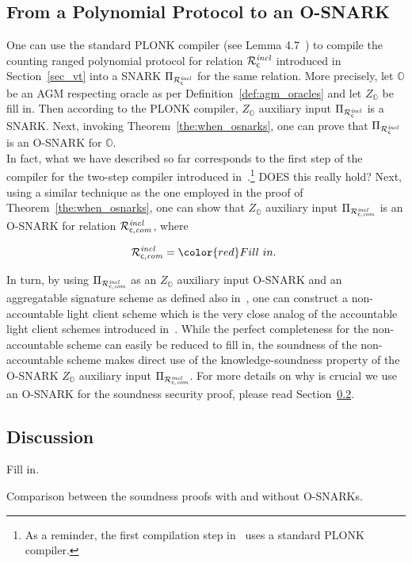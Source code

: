 \subsection{From a Polynomial Protocol to an O-SNARK}
\label{sec:interesting}
\noindent One can use the standard PLONK compiler (see Lemma 4.7~\cite{plonk}) to compile the 
counting ranged polynomial protocol for relation $\mathcal{R}^{\mathit{incl}}_{\mathsf{c}}$ introduced in Section~\ref{sec_vt} 
into a SNARK $\Pi_{\mathcal{R}^{\mathit{incl}}_{\mathsf{c}}}$ for the same relation. More precisely, let $\mathbb{O}$ be an 
AGM respecting oracle as per Definition~\ref{def:agm_oracles} and let $Z_{\mathbb{O}}$ be {\color{red} fill in}. 
Then according to the PLONK compiler, $Z_{\mathbb{O}}$ auxiliary input $\Pi_{\mathcal{R}^{\mathit{incl}}_{\mathsf{c}}}$ is a SNARK.
Next, invoking Theorem~\ref{the:when_osnarks}, one can prove that $\Pi_{\mathcal{R}^{\mathit{incl}}_{\mathsf{c}}}$ is an O-SNARK for $\mathbb{O}$. \\

\noindent In fact, what we have described so far corresponds to the first step of the compiler for the two-step compiler 
introduced in~\cite{LC_paper}.\footnote{As a reminder, the first compilation step in~\cite{LC_paper} uses a standard PLONK compiler.}
{\color{red} DOES this really hold?} Next, using a similar technique as the one employed in the proof of Theorem~\ref{the:when_osnarks}, one can show that 
$Z_{\mathbb{O}}$ auxiliary input $\Pi_{\mathcal{R}^{\mathit{incl}}_{\mathsf{c},\mathit{com}}}$ is an O-SNARK for relation $\mathcal{R}^{\mathit{incl}}_{\mathsf{c},\mathit{com}}$, where

$$\Rvtcom = {\color{red}Fill \ in. \ }$$

\noindent In turn, by using $\Pi_{\mathcal{R}^{\mathit{incl}}_{\mathsf{c},\mathit{com}}}$ as an $Z_{\mathbb{O}}$ auxiliary input O-SNARK and an aggregatable signature 
scheme as defined also in~\cite{LC_paper}, one can construct a non-accountable light client scheme which is the very close analog 
of the accountable light client schemes introduced in~\cite{LC_paper}. While the perfect completeness for the non-accountable scheme 
can easily be reduced to {\color{red} fill in}, the soundness of the non-accountable scheme makes direct use of the knowledge-soundness 
property of the O-SNARK $Z_{\mathbb{O}}$ auxiliary input $\Pi_{\mathcal{R}^{\mathit{incl}}_{\mathsf{c},\mathit{com}}}$. For more details on why is crucial we use an O-SNARK 
for the soundness security proof, please read Section~\ref{sec:discussion}.

\subsection{Discussion}
\label{sec:discussion}

{\color{red} Fill in.}

{\color{red} Comparison between the soundness proofs with and without O-SNARKs.}

